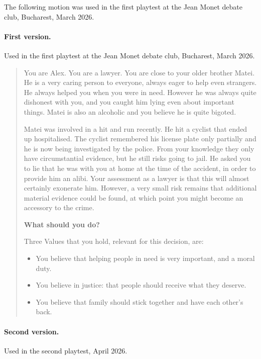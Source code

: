 \documentclass[12pt]{article}
\begin{document}
The following motion was used in the first playtest at the Jean Monet debate club, Bucharest, March 2026.

\paragraph{First version.} Used in the first playtest at the Jean Monet debate club, Bucharest, March 2026.

\begin{quote}
You are Alex. You are a lawyer. You are close to your older brother Matei. He is a very caring person to everyone, always eager to help even strangers. He always helped you when you were in need. However he was always quite dishonest with you, and you caught him lying even about important things. Matei is also an alcoholic and you believe he is quite bigoted.

\medskip

Matei was involved in a hit and run recently. He hit a cyclist that ended up hospitalised. The cyclist remembered his license plate only partially and he is now being investigated by the police. From your knowledge they only have circumstantial evidence, but he still risks going to jail. He asked you to lie that he was with you at home at the time of the accident, in order to provide him an alibi. Your assessment as a lawyer is that this will almost certainly exonerate him. However, a very small risk remains that additional material evidence could be found, at which point you might become an accessory to the crime.

\medskip

\textbf{What should you do?}

\medskip

Three Values that you hold, relevant for this decision, are:
\begin{itemize}
    \item You believe that helping people in need is very important, and a moral duty.
    \item You believe in justice: that people should receive what they deserve.
    \item You believe that family should stick together and have each other's back.
\end{itemize}
\end{quote}

\paragraph{Second version.} Used in the second playtest, April 2026.
\end{document}
